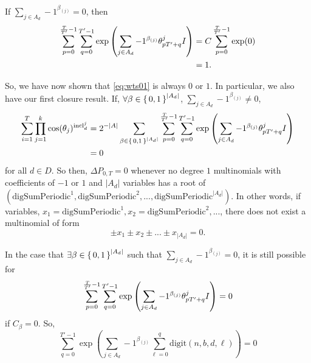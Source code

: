 \documentclass[11pt,titlepage]{article}
\newcommand{\rationalPeriodTotal}{{T}'}
\newcommand{\seedAngle}[1]{{\theta^j_{#1}}}
\newcommand{\totalPeriod}{T}
\newcommand{\inclIndic}[2]{{\mathrm{incl}_{#1}^{#2}}}
\newcommand{\combSingleTerm}[1]{\prod_{j=1}^k \cos(\theta_j) ^ {\inclIndic{#1}{j}}}
\newcommand{\digSumPeriodicNoJ}{\mathrm{digSumPeriodic}}
\begin{document}
If $\sum_{j \in A_d} -1 ^ {\beta_{(j)}} = 0$, then 
\begin{align*}
  \eqWTSInnerProd &= C \sum_{p= 0}^{\frac{\totalPeriod}{\rationalPeriodTotal} - 1} \exp(0) \\
  &= 1.
\end{align*}

So, we have now shown that \eqref{eq:wts01} is always $0$ or $1$. In particular, we also have our first 
closure result. If, $\forall \beta \in \set{0, 1}^{|A_d|}$, $\sum_{j \in A_d} -1 ^ {\beta_{(j)}} \neq 0$,
\begin{align*}
  \sum_{i = 1}^T \combSingleTerm{d} &=  2^{-|A|} 
  \sum_{\beta \in \set{0,1}^{|A_d|}} 
      \sum_{p= 0}^{\frac{\totalPeriod}{\rationalPeriodTotal} - 1} \sum_{q = 0}^{\rationalPeriodTotal - 1}
     \exp\left(
         \sum_{j \in A_d} -1 ^ {\beta_{(j)}}
         \seedAngle{p \rationalPeriodTotal + q}I
       \right) \\
        &= 0
\end{align*}
for all $d \in D$.
So then, $\Delta P_{0, T} = 0$ whenever 
no degree $1$ multinomials with coefficients of $-1$ or $1$ and $|A_d|$ variables has a root of $(\digSumPeriodicNoJ^1, \digSumPeriodicNoJ^2, ..., \digSumPeriodicNoJ^{|A_d|})$.
In other words, if variables, $x_1 = \digSumPeriodicNoJ^1, x_2 = \digSumPeriodicNoJ^2, ...$, there does not exist a multinomial
of form 
$$
  \pm x_1 \pm x_2 \pm ... \pm x_{|A_d|} = 0.
$$

In the case that $\exists \beta \in \set{0, 1}^{|A_d|}$ such that $\sum_{j \in A_d} -1 ^ {\beta_{(j)}} = 0$, it is still possible
for
$$
\eqWTSInnerProd = 0
$$
if $C_\beta = 0$. So, 
\begin{equation*}
  \sum_{q = 0}^{\rationalPeriodTotal - 1}
  \exp\left(
      \sum_{j \in A_d} -1 ^ {\beta_{(j)}}
        \sum_{\ell = 0}^{q}\mathrm{digit}(n, b, d, \ell)
  \right) = 0
\end{equation*}


\end{document}
